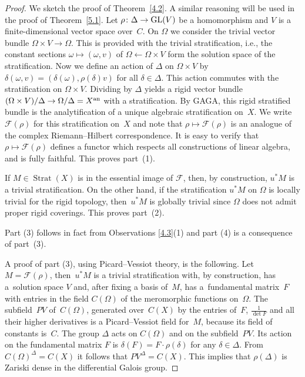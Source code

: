 \documentclass[10pt,a4paper]{amsart}
\numberwithin{equation}{section}
\begin{document}
\begin{proof}We sketch the proof of Theorem~\ref{4.2}. A similar reasoning will be used in the proof of Theorem~\ref{5.1}. Let $\rho\colon \Delta \rightarrow {\rm GL}(V)$ be a homomorphism and $V$ is a finite-dimensional vector space over~$C$. On $\Omega$ we consider the trivial vector bundle $\Omega \times V\rightarrow \Omega$. This is provided with the trivial stratification, i.e., the constant sections $\omega \mapsto (\omega ,v)$ of $\Omega \leftarrow \Omega \times V$ form the solution space of the stratification. Now we define an action of $\Delta$ on $\Omega \times V$ by $\delta (\omega, v)=(\delta (\omega), \rho(\delta )v)$ for all $\delta \in \Delta$. This action commutes with the stratification on $\Omega \times V$. Dividing by $\Delta$ yields a rigid vector bundle $(\Omega \times V)/\Delta \rightarrow \Omega /\Delta =X^{\rm an}$ with a stratification. By GAGA, this rigid stratified bundle is the analytification of a unique algebraic stratification on~$X$. We write $\mathcal{F}(\rho)$ for this stratification on~$X$ and note that $\rho \mapsto \mathcal{F}(\rho)$ is an analogue of the complex Riemann--Hilbert correspondence. It is easy to verify that $\rho \mapsto \mathcal{F}(\rho)$ defines a functor which respects all constructions of linear algebra, and is fully faithful. This proves part~(1).

If $M\in \operatorname{Strat}(X)$ is in the essential image of $\mathcal{F}$, then, by construction, $u^*M$ is a trivial stratification. On the other hand, if the stratification $u^*M$ on $\Omega$ is locally trivial for the rigid topology, then~$u^*M$ is globally trivial since $\Omega$ does not admit proper rigid coverings. This proves part~(2).

Part (3) follows in fact from Observations \ref{4.3}(1) and part (4) is a consequence of part~(3).

A proof of part (3), using Picard--Vessiot theory, is the following. Let $M=\mathcal{F}(\rho)$, then~$u^*M$ is a trivial stratification with, by construction, has a~solution space $V$ and, after fixing a basis of~$M$, has a~fundamental matrix~$F$ with entries in the field $C(\Omega)$ of the meromorphic functions on~$\Omega$. The subfield~$PV$ of~$C(\Omega)$, generated over~$C(X)$ by the entries of~$F$, $\frac{1}{\det F}$ and all their higher derivatives is a Picard--Vessiot field for~$M$, because its field of constants is~$C$. The group $\Delta$ acts on $C(\Omega)$ and on the subfield~$PV$. Its action on the fundamental matrix $F$ is $\delta (F)=F\cdot \rho(\delta)$ for any $\delta \in \Delta$. From $C(\Omega )^\Delta=C(X)$ it follows that $PV^\Delta =C(X)$. This implies that $\rho(\Delta)$ is Zariski dense in the differential Galois group.
\end{proof}
\end{document}
